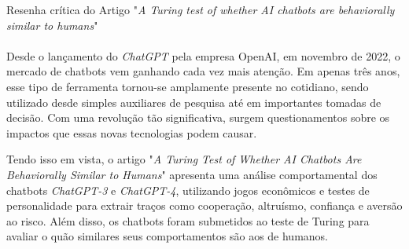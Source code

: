 \documentclass[a4paper,12pt]{article}
\begin{document}
	\begin{Large}
		Resenha crítica do Artigo "\textit{A Turing test of whether AI chatbots are behaviorally similar to humans}" \cite{gptTuringTest}
	\end{Large} 
	
	\paragraph{}
	
	
	Desde o lançamento do \textit{ChatGPT} pela empresa OpenAI, em novembro de 2022, o mercado de chatbots vem ganhando cada vez mais atenção. Em apenas três anos, esse tipo de ferramenta tornou-se amplamente presente no cotidiano, sendo utilizado desde simples auxiliares de pesquisa até em importantes tomadas de decisão. Com uma revolução tão significativa, surgem questionamentos sobre os impactos que essas novas tecnologias podem causar.  
	
	Tendo isso em vista, o artigo "\textit{A Turing Test of Whether AI Chatbots Are Behaviorally Similar to Humans}" \cite{gptTuringTest} apresenta uma análise comportamental dos chatbots \textit{ChatGPT-3} e \textit{ChatGPT-4}, utilizando jogos econômicos e testes de personalidade para extrair traços como cooperação, altruísmo, confiança e aversão ao risco. Além disso, os chatbots foram submetidos ao teste de Turing para avaliar o quão similares seus comportamentos são aos de humanos.
	
	
	
\end{document}
